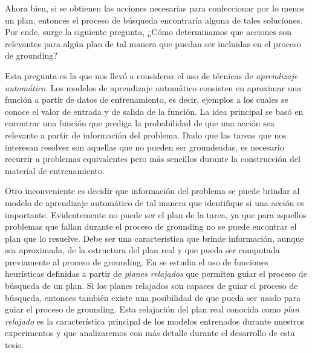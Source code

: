 Ahora bien, si se obtienen las acciones necesarias para confeccionar por lo
menos un plan, entonces el proceso de búsqueda encontraría alguna de tales
soluciones. Por ende, surge la siguiente pregunta, ¿Cómo determinamos que
acciones son relevantes para algún plan de tal manera que puedan ser incluidas
en el proceso de grounding?

Esta pregunta es la que nos llevó a considerar el uso de técnicas de
\emph{aprendizaje automático}. Los modelos de aprendizaje automático consisten
en aproximar una función a partir de datos de entrenamiento, es decir, ejemplos
a los cuales se conoce el valor de entrada y de salida de la función. La idea
principal se basó en encontrar una función que prediga la probabilidad de que
una acción sea relevante a partir de información del problema. Dado que las
tareas que nos interesan resolver son aquellas que no pueden ser groundeadas, es
necesario recurrir a problemas equivalentes pero más sencillos durante la
construcción del material de entrenamiento.

Otro inconveniente es decidir que información del problema se puede brindar al
modelo de aprendizaje automático de tal manera que identifique si una acción es
importante. Evidentemente no puede ser el plan de la tarea, ya que para aquellos
problemas que fallan durante el proceso de grounding no se puede encontrar el
plan que lo resuelve. Debe ser una característica que brinde información, aunque
sea aproximada, de la estructura del plan real y que pueda ser computada
previamente al proceso de grounding. En \citep{hoffman-2001} se estudia el uso
de funciones heurísticas definidas a partir de \emph{planes relajados} que
permiten guiar el proceso de búsqueda de un plan. Si los planes relajados son
capaces de guiar el proceso de búsqueda, entonces también existe una posibilidad
de que pueda ser usado para guiar el proceso de grounding. Esta relajación del
plan real conocida como \emph{plan relajado} es la característica principal de
los modelos entrenados durante nuestros experimentos y que analizaremos con más
detalle durante el desarrollo de esta tesis.

